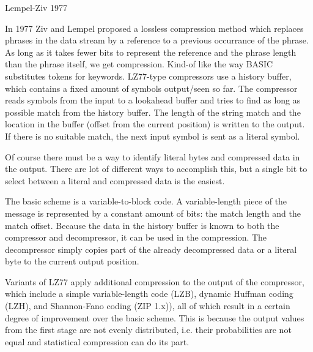 \begin{frame}
Lempel-Ziv 1977

In 1977 Ziv and Lempel proposed a lossless compression method which replaces phrases in the data stream by a reference to a previous occurrance of the phrase. As long as it takes fewer bits to represent the reference and the phrase length than the phrase itself, we get compression. Kind-of like the way BASIC substitutes tokens for keywords.
LZ77-type compressors use a history buffer, which contains a fixed amount of symbols output/seen so far. The compressor reads symbols from the input to a lookahead buffer and tries to find as long as possible match from the history buffer. The length of the string match and the location in the buffer (offset from the current position) is written to the output. If there is no suitable match, the next input symbol is sent as a literal symbol.

Of course there must be a way to identify literal bytes and compressed data in the output. 
There are lot of different ways to accomplish this, but a single bit to select between a literal and compressed data is the easiest.

The basic scheme is a variable-to-block code. A variable-length piece of the message is represented by a constant amount of bits: the match length and the match offset. Because the data in the history buffer is known to both the compressor and decompressor, it can be used in the compression. The decompressor simply copies part of the already decompressed data or a literal byte to the current output position.

Variants of LZ77 apply additional compression to the output of the compressor, which include a simple variable-length code (LZB), dynamic Huffman coding (LZH), and Shannon-Fano coding (ZIP 1.x)), all of which result in a certain degree of improvement over the basic scheme. This is because the output values from the first stage are not evenly distributed, i.e. their probabilities are not equal and statistical compression can do its part.

\end{frame}
